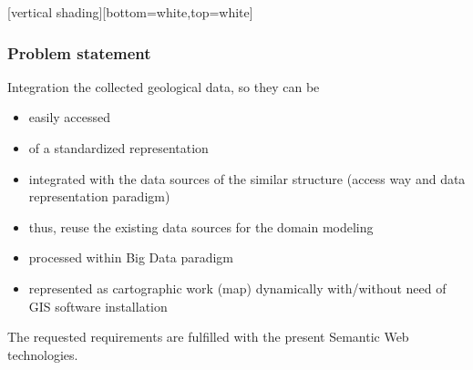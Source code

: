 \documentclass[10pt]{beamer}
\providecommand{\email}[1]{\texttt{#1}}
\begin{document}
[vertical shading][bottom=white,top=white]



\begin{frame}
  \frametitle{Problem statement}
  Integration the collected geological data, so they can be
  \begin{itemize}
  \item easily accessed
  \item of a standardized representation
  \item integrated with the data sources of the similar structure (access way and data representation paradigm) %
  \item thus, reuse the existing data sources for the domain modeling
  \item processed within Big Data paradigm
  \item represented as cartographic work (map) dynamically with/without need of GIS software installation
  \end{itemize}
  The requested requirements are fulfilled with the present Semantic Web technologies.
\end{frame}
\end{document}
